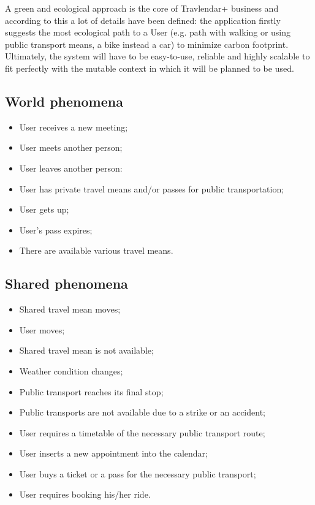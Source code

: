 \documentclass[a4paper,leqno]{book}
\begin{document}
A green and ecological approach is the core of Travlendar+ business and according to this a lot of details have been defined:  the application firstly suggests the most ecological path to a User (e.g. path with walking or using public transport means, a bike instead a car) to minimize carbon footprint. 
Ultimately, the system will have to be easy-to-use, reliable and highly scalable to fit perfectly  with the mutable context in which it will be planned to be used.


\subsection{World phenomena}

\begin{itemize}
	\item User receives a new meeting;
	\item User meets another person;
	\item User leaves another person:
	\item User has private travel means and/or passes for public transportation;
	\item User gets up;
	\item User's pass expires; 
	\item There are available various travel means.
\end{itemize}

\subsection{Shared phenomena}

\begin{itemize}
	\item Shared travel mean moves;
	\item User moves;
	\item Shared travel mean is not available;
	\item Weather condition changes;
	\item Public transport reaches its final stop;
	\item Public transports are not available due to a strike or an accident;
	\item User requires a timetable of the necessary public transport route;
	\item User inserts a new appointment into the calendar;
	\item User buys a ticket or a pass for the necessary public transport;
	\item User requires booking his/her ride.	 
\end{itemize}
\end{document}

